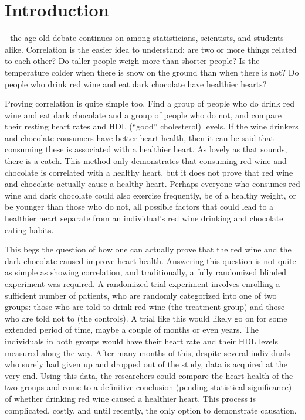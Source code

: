 \chapter{Introduction}
\label{introduction}

 - the age old debate continues on among statisticians, scientists, and students alike.  Correlation is the easier idea to understand: are two or more things related to each other?  Do taller people weigh more than shorter people?  Is the temperature colder when there is snow on the ground than when there is not?  Do people who drink red wine and eat dark chocolate have healthier hearts? 

Proving correlation is quite simple too.  Find a group of people who do drink red wine and eat dark chocolate and a group of people who do not, and compare their resting heart rates and HDL (``good'' cholesterol) levels.  If the wine drinkers and chocolate consumers have better heart health, then it can be said that consuming these is associated with a healthier heart.  As lovely as that sounds, there is a catch.  This method only demonstrates that consuming red wine and chocolate is correlated with a healthy heart, but it does not prove that red wine and chocolate actually cause a healthy heart.  Perhaps everyone who consumes red wine and dark chocolate could also exercise frequently,  be of a healthy weight, or be younger than those who do not, all possible factors that could lead to a healthier heart separate from an individual's red wine drinking and chocolate eating habits.  
 
This begs the question of how one can actually prove that the red wine and the dark chocolate caused improve heart health.  Answering this question is not quite as simple as showing correlation, and traditionally, a fully randomized blinded experiment was required.  A randomized trial experiment involves enrolling a sufficient number of patients, who are randomly categorized into one of two groups: those who are told to drink red wine (the treatment group) and those who are told not to (the controls).  A trial like this would likely go on for some extended period of time, maybe a couple of months or even years.  The individuals in both groups would have their heart rate and their HDL levels measured along the way.  After many months of this, despite several individuals who surely had given up and dropped out of the study, data is acquired at the very end.  Using this data, the researchers could compare the heart health of the two groups and come to a definitive conclusion (pending statistical significance) of whether drinking red wine caused a healthier heart.  This process is complicated, costly, and until recently, the only option to demonstrate causation.  
 
